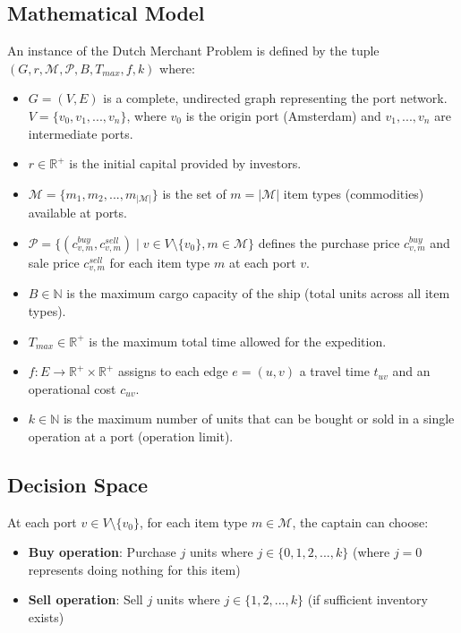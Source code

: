 \documentclass[12pt]{article}
\begin{document}
\subsection{Mathematical Model}

An instance of the Dutch Merchant Problem is defined by the tuple $(G, r, \mathcal{M}, \mathcal{P}, B, T_{max}, f, k)$ where:

\begin{itemize}
    \item $G=(V, E)$ is a complete, undirected graph representing the port network. $V = \{v_0, v_1, ..., v_n\}$, where $v_0$ is the origin port (Amsterdam) and $v_1, ..., v_n$ are intermediate ports.
    \item $r \in \mathbb{R}^+$ is the initial capital provided by investors.
    \item $\mathcal{M} = \{m_1, m_2, ..., m_{|\mathcal{M}|}\}$ is the set of $m = |\mathcal{M}|$ item types (commodities) available at ports.
    \item $\mathcal{P} = \{(c_{v,m}^{buy}, c_{v,m}^{sell}) \mid v \in V \setminus \{v_0\}, m \in \mathcal{M}\}$ defines the purchase price $c_{v,m}^{buy}$ and sale price $c_{v,m}^{sell}$ for each item type $m$ at each port $v$.
    \item $B \in \mathbb{N}$ is the maximum cargo capacity of the ship (total units across all item types).
    \item $T_{max} \in \mathbb{R}^+$ is the maximum total time allowed for the expedition.
    \item $f: E \rightarrow \mathbb{R}^+ \times \mathbb{R}^+$ assigns to each edge $e=(u,v)$ a travel time $t_{uv}$ and an operational cost $c_{uv}$.
    \item $k \in \mathbb{N}$ is the maximum number of units that can be bought or sold in a single operation at a port (operation limit).
\end{itemize}

\subsection{Decision Space}

At each port $v \in V \setminus \{v_0\}$, for each item type $m \in \mathcal{M}$, the captain can choose:

\begin{itemize}
    \item \textbf{Buy operation}: Purchase $j$ units where $j \in \{0, 1, 2, ..., k\}$ (where $j=0$ represents doing nothing for this item)
    \item \textbf{Sell operation}: Sell $j$ units where $j \in \{1, 2, ..., k\}$ (if sufficient inventory exists)
\end{itemize}
\end{document}
